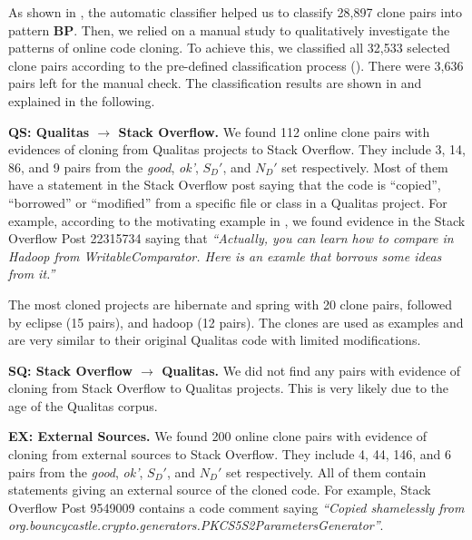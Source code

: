 \documentclass[sigconf,review, anonymous]{acmart}
\begin{document}
As shown in , the automatic
classifier helped us to classify 28,897 clone pairs into
pattern \textbf{BP}. Then, we relied on a manual study to qualitatively investigate the patterns of
online code cloning. To achieve this, we classified all 32,533
selected clone pairs according to the pre-defined classification process 
().  
%
There were 3,636 pairs left for the manual check. 
 The classification
results are shown in  and explained in
the following.

\textbf{QS: Qualitas $\rightarrow$ Stack Overflow.} We found 112
online clone pairs with evidences of cloning from Qualitas projects to
Stack Overflow. They include 3, 14, 86, and 9 pairs from the
\textit{good}, \textit{ok'}, $S_D'$, and $N_D'$ set respectively. Most of
them have a statement in the Stack Overflow post saying that the code
is ``copied'', ``borrowed'' or ``modified'' from a specific file or class in a
Qualitas project. For example, according to the motivating example in 
, we found evidence in the Stack Overflow 
Post 22315734 saying that \textit{``Actually, you can learn how to compare 
in Hadoop from WritableComparator. Here is an examle that borrows 
some ideas from it.''}

The most cloned projects are \textsf{hibernate} and
\textsf{spring} with 20 clone pairs, followed by \textsf{eclipse} (15
pairs), and \textsf{hadoop} (12 pairs). The clones are used as
examples and are very similar to their original Qualitas code with
limited modifications.

\textbf{SQ: Stack Overflow $\rightarrow$ Qualitas.} We did not find
any pairs with evidence of cloning from Stack Overflow to Qualitas
projects. This is very likely due to the age of the Qualitas corpus.

\textbf{EX: External Sources.} We found 200 online clone pairs with
evidence of cloning from external sources to Stack Overflow.  They
include 4, 44, 146, and 6 pairs from the \textit{good}, \textit{ok'},
$S_D'$, and $N_D'$ set respectively. All of them contain statements
giving an external source of the cloned code.  For example, Stack
Overflow Post 9549009 contains a code comment saying \textit{``Copied
  shamelessly from
  org.bouncycastle.crypto.generators.PKCS5S2ParametersGenerator''}.
\end{document}
